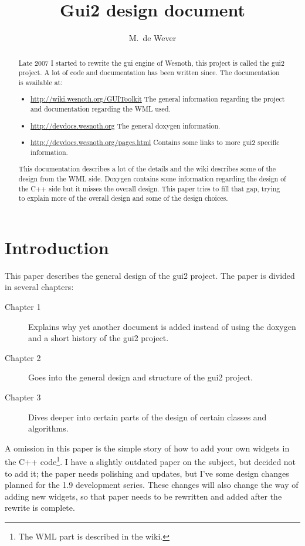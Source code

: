 \documentclass[a4paper,notitlepage,twocolumn,draft]{report}
\author{M.~de Wever}
\title{Gui2 design document}
\begin{document}
\maketitle

\tableofcontents

\begin{abstract}

Late 2007 I started to rewrite the gui engine of Wesnoth, this project is called
the gui2 project. A lot of code and documentation has been written since. The
documentation is available at:
\begin{itemize}
\item \url{http://wiki.wesnoth.org/GUIToolkit} The general information
	regarding the project and documentation regarding the WML used.
\item \url{http://devdocs.wesnoth.org} The general doxygen information.
\item \url{http://devdocs.wesnoth.org/pages.html} Contains some links to more
	gui2 specific information.
\end{itemize}

This documentation describes a lot of the details and the wiki describes some of
the design from the WML side. Doxygen contains some information regarding the
design of the C++ side but it misses the overall design. This paper tries to
fill that gap, trying to explain more of the overall design and some of the
design choices.

\end{abstract}


\chapter{Introduction}

This paper describes the general design of the gui2 project. The paper is
divided in several chapters:
\begin{description}
\item[Chapter 1] Explains why yet another document is added instead of using the
	doxygen and a short history of the gui2 project.
\item[Chapter 2] Goes into the general design and structure of the gui2 project.
\item[Chapter 3] Dives deeper into certain parts of the design of certain
	classes and algorithms.
\end{description}

A omission in this paper is the simple story of how to add your own widgets in
the C++ code\footnote{The WML part is described in the wiki.}. I have a slightly
outdated paper on the subject, but decided not to add it; the paper needs
polishing and updates, but I've some design changes planned for the 1.9
development series. These changes will also change the way of adding new
widgets, so that paper needs to be rewritten and added after the rewrite is
complete.
\end{document}

